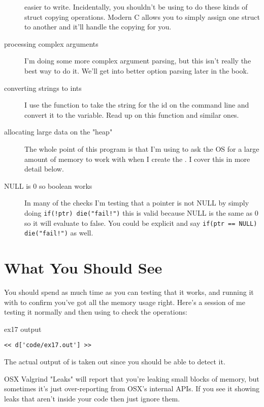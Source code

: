 \begin{description}
    easier to write.  Incidentally, you shouldn't be using  to do
    these kinds of struct copying operations. Modern C allows you to simply assign
    one struct to another and it'll handle the copying for you.
\item [processing complex arguments] I'm doing some more complex argument parsing,
    but this isn't really the best way to do it.  We'll get into better option
    parsing later in the book.
\item [converting strings to ints] I use the  function to take the
    string for the id on the command line and convert it to the 
    variable.  Read up on this function and similar ones.
\item [allocating large data on the "heap"] The whole point of this program is
    that I'm using  to ask the OS for a large amount of memory
    to work with when I create the .  I cover this in more
    detail below.
\item [NULL is 0 so boolean works] In many of the checks I'm testing that a
    pointer is not NULL by simply doing \verb|if(!ptr) die("fail!")| this is
    valid because NULL is the same as 0 so it will evaluate to false.  You could
    be explicit and say \verb|if(ptr == NULL) die("fail!")| as well.
\end{description}


\section{What You Should See}

You should spend as much time as you can testing that it works, and running
it with  to confirm you've got all the memory usage
right.  Here's a session of me testing it normally and then using
 to check the operations:

\begin{code}{ex17 output}
\begin{lstlisting}
<< d['code/ex17.out'] >>
\end{lstlisting}
\end{code}

The actual output of  is taken out since you should
be able to detect it.

\begin{aside}{OSX Valgrind "Leaks"}
 will report that you're leaking small blocks of memory,
but sometimes it's just over-reporting from OSX's internal APIs.  If you see it
showing leaks that aren't inside your code then just ignore them.
\end{aside}

